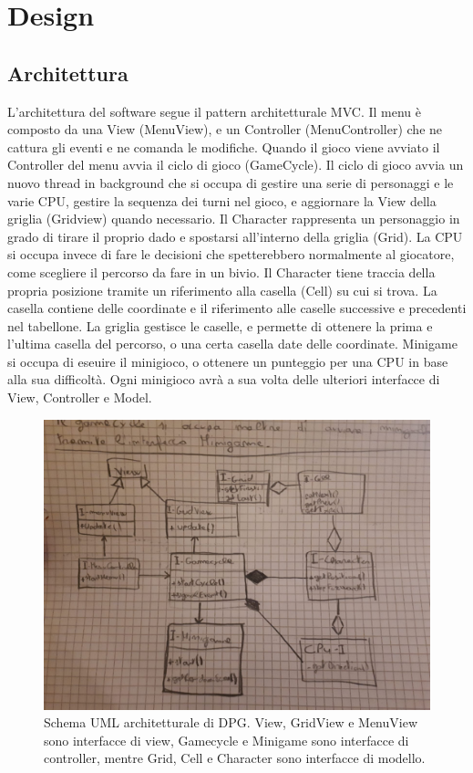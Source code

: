 \documentclass[a4paper,12pt]{report}
\begin{document}
\chapter{Design}

\section{Architettura}

L'architettura del software segue il pattern architetturale MVC.
%
Il menu è composto da una View (MenuView), e un Controller (MenuController) che ne cattura gli eventi e ne comanda le modifiche.
%
Quando il gioco viene avviato il Controller del menu avvia il ciclo di gioco (GameCycle).
%
Il ciclo di gioco avvia un nuovo thread in background che si occupa di gestire una serie di personaggi e le varie CPU, gestire la sequenza dei turni nel gioco, e aggiornare la View della griglia (Gridview) quando necessario.
%
Il Character rappresenta un personaggio in grado di tirare il proprio dado e spostarsi all'interno della griglia (Grid).
%
La CPU si occupa invece di fare le decisioni che spetterebbero normalmente al giocatore, come scegliere il percorso da fare in un bivio.
%
Il Character tiene traccia della propria posizione tramite un riferimento alla casella (Cell) su cui si trova.
%
La casella contiene delle coordinate e il riferimento alle caselle successive e precedenti nel tabellone.
%
La griglia gestisce le caselle, e permette di ottenere la prima e l'ultima casella del percorso, o una certa casella date delle coordinate.
%
Minigame si occupa di eseuire il minigioco, o ottenere un punteggio per una CPU in base alla sua difficoltà.
%
Ogni minigioco avrà a sua volta delle ulteriori interfacce di View, Controller e Model.

\begin{figure}[!t]
\centering{}
\includegraphics[width=\textwidth]{images/arch.jpeg}
\caption{Schema UML architetturale di DPG. View, GridView e MenuView sono interfacce di view, Gamecycle e Minigame sono interfacce di controller, mentre Grid, Cell e Character sono interfacce di modello.}
\label{img:goodarch}
\end{figure}
\end{document}
